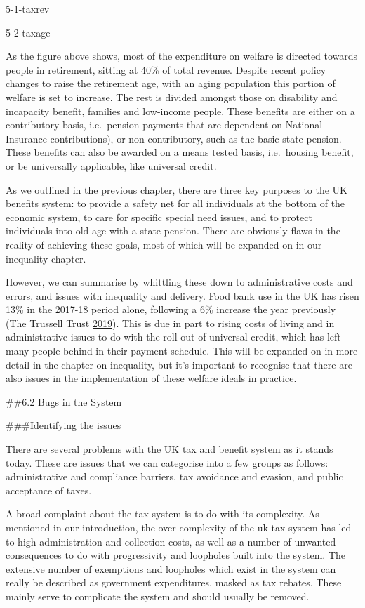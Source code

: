 \documentclass[]{article}
\begin{document}
{5-1-taxrev}

{5-2-taxage}

As the figure above shows, most of the expenditure on welfare is
directed towards people in retirement, sitting at 40\% of total revenue.
Despite recent policy changes to raise the retirement age, with an aging
population this portion of welfare is set to increase. The rest is
divided amongst those on disability and incapacity benefit, families and
low-income people. These benefits are either on a contributory basis,
i.e.~pension payments that are dependent on National Insurance
contributions), or non-contributory, such as the basic state pension.
These benefits can also be awarded on a means tested basis, i.e.~housing
benefit, or be universally applicable, like universal credit.

As we outlined in the previous chapter, there are three key purposes to
the UK benefits system: to provide a safety net for all individuals at
the bottom of the economic system, to care for specific special need
issues, and to protect individuals into old age with a state pension.
There are obviously flaws in the reality of achieving these goals, most
of which will be expanded on in our inequality chapter.

However, we can summarise by whittling these down to administrative
costs and errors, and issues with inequality and delivery. Food bank use
in the UK has risen 13\% in the 2017-18 period alone, following a 6\%
increase the year previously (The Trussell Trust
\protect\hyperlink{ref-TheTrussellTrust2019}{2019}). This is due in part
to rising costs of living and in administrative issues to do with the
roll out of universal credit, which has left many people behind in their
payment schedule. This will be expanded on in more detail in the chapter
on inequality, but it's important to recognise that there are also
issues in the implementation of these welfare ideals in practice.

\#\#6.2 Bugs in the System

\#\#\#Identifying the issues

There are several problems with the UK tax and benefit system as it
stands today. These are issues that we can categorise into a few groups
as follows: administrative and compliance barriers, tax avoidance and
evasion, and public acceptance of taxes.

A broad complaint about the tax system is to do with its complexity. As
mentioned in our introduction, the over-complexity of the uk tax system
has led to high administration and collection costs, as well as a number
of unwanted consequences to do with progressivity and loopholes built
into the system. The extensive number of exemptions and loopholes which
exist in the system can really be described as government expenditures,
masked as tax rebates. These mainly serve to complicate the system and
should usually be removed.
\end{document}
